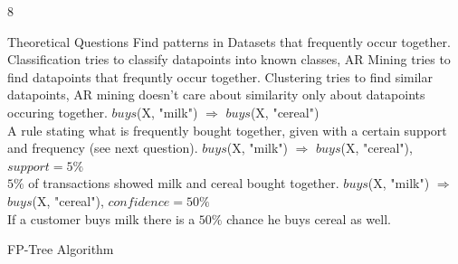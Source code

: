 \documentclass{article}
\begin{document}
    \begin{ukon-infie}[10.01.18]{8}

        \begin{exercise}[p=3]{Theoretical Questions}  
        \question{}
        {
        	Find patterns in Datasets that frequently occur together.
        }
    	\question{}
    	{
    		Classification tries to classify datapoints into known classes, AR Mining tries to find datapoints that frequntly occur together.
    	}
    	\question{}
    	{
    		Clustering tries to find similar datapoints, AR mining doesn't care about similarity only about datapoints occuring together.
    	}
    	\question{}
    	{
			$buys$(X, "milk") $\Rightarrow$ $buys$(X, "cereal") \\
			A rule stating what is frequently bought together, given with a certain support and frequency (see next question).   	
    	}
    	\question{}
    	{
			$buys$(X, "milk") $\Rightarrow$ $buys$(X, "cereal"), $support=5\%$\\ $5\%$ of transactions showed milk and cereal bought together.
    	}
    	\question{}
    	{
			$buys$(X, "milk") $\Rightarrow$ $buys$(X, "cereal"), $confidence=50\%$\\
			If a customer buys milk there is a $50\%$ chance he buys cereal as well.   	
    	}
    	

		\end{exercise}
		
		\begin{exercise}[p=6]{FP-Tree Algorithm}
		\question{}{

}
\end{exercise}
\end{ukon-infie}
\end{document}
